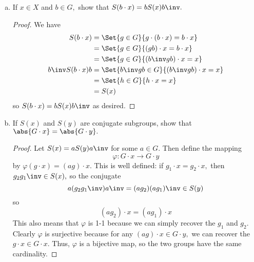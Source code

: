 \documentclass{article}
\begin{document}
\begin{itemize}
\begin{enumerate}[(a)]
\begin{proof}
				\end{proof}

			\item If $x\in X$ and $b\in G,$ show that $S(b\cdot x)=bS(x)b\inv.$
				\begin{proof}
					We have 
					\begin{align*}
						S(b\cdot x) &= \Set{g\in G}{g\cdot (b\cdot x) = b\cdot x} \\
						&= \Set{g\in G}{(gb)\cdot x = b\cdot x} \\
						&= \Set{g\in G}{(b\inv gb)\cdot x = x} \\
						b\inv S(b\cdot x)b &= \Set{b\inv gb\in G}{(b\inv gb)\cdot x = x} \\
						&= \Set{h\in G}{h\cdot x = x} \\
						&= S(x)
					\end{align*} so $S(b\cdot x) = bS(x)b\inv$ as desired.
					
				\end{proof}

			\item If $S(x)$ and $S(y)$ are conjugate subgroups, show that $\abs{G\cdot x}=\abs{G\cdot y}.$
				\begin{proof}
					Let $S(x)=aS(y)a\inv$ for some $a\in G.$ Then define the mapping \[\varphi:G\cdot x\to G\cdot y\] by $\varphi(g\cdot x) = (ag)\cdot x.$ This is well defined: if $g_1\cdot x = g_2\cdot x,$ then $g_2 g_1\inv\in S(x),$ so the conjugate \[a(g_2 g_1\inv)a\inv = (ag_2)(ag_1)\inv \in S(y)\] so \[(ag_2)\cdot x = (ag_1)\cdot x\] This also means that $\varphi$ is 1-1 because we can simply recover the $g_1$ and $g_2.$ Clearly $\varphi$ is surjective because for any $(ag)\cdot x\in G\cdot y,$ we can recover the $g\cdot x\in G\cdot x.$ Thus, $\varphi$ is a bijective map, so the two groups have the same cardinality.
					
				\end{proof}
				
		\end{enumerate}
		
\end{itemize}
\end{document}
